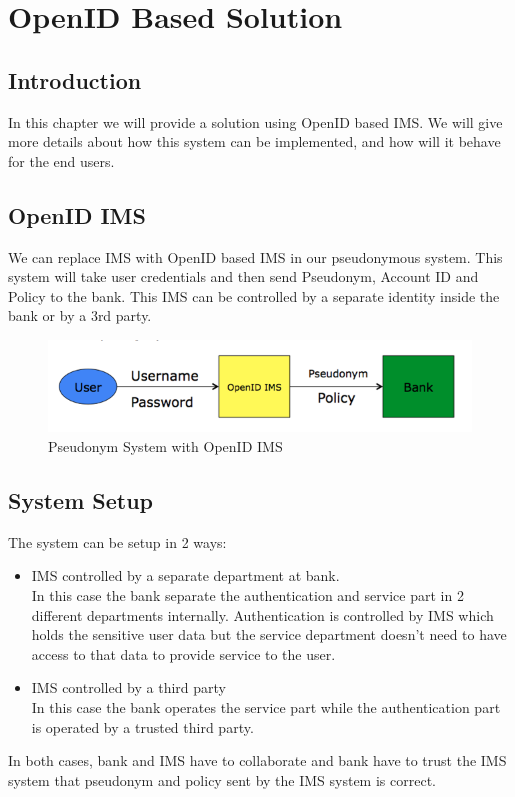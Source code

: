 \chapter{OpenID Based Solution}
\section{Introduction}
In this chapter we will provide a solution using OpenID based IMS. We will give more details about how this system can be implemented, and how will it behave for the end users.
\section{OpenID IMS}
We can replace IMS with OpenID based IMS in our pseudonymous system. This system will take user credentials and then send Pseudonym, Account ID and Policy to the bank. This IMS can be controlled by a separate identity inside the bank or by a 3rd party.
\begin{figure}[h]
	\centering
	\includegraphics[width=\textwidth]{figures/OpenID}
	\caption{Pseudonym System with OpenID IMS}
	\label{fig:OpenID}
\end{figure}
\section{System Setup}
The system can be setup in 2 ways:
\begin{itemize}
	\item IMS controlled by a separate department at bank.\\
	In this case the bank separate the authentication and service part in 2 different departments internally. Authentication is controlled by IMS which holds the sensitive user data but the service department doesn't need to have access to that data to provide service to the user.
	\item IMS controlled by a third party\\
	In this case the bank operates the service part while the authentication part is operated by a trusted third party.
\end{itemize}
In both cases, bank and IMS have to collaborate and bank have to trust the IMS system that pseudonym and policy sent by the IMS system is correct.

